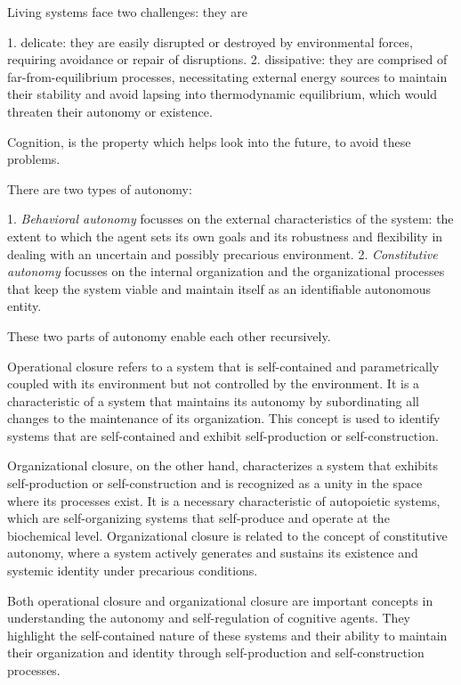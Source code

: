 Living systems face two challenges: they are 

1. delicate: they are easily disrupted or destroyed by environmental forces, requiring avoidance or repair of disruptions.
2. dissipative: they are comprised of far-from-equilibrium processes, necessitating external energy sources to maintain their stability and avoid lapsing into thermodynamic equilibrium, which would threaten their autonomy or existence.


Cognition, is the property which helps look into the future, to avoid these problems.

There are two types of autonomy:

1. \emph{Behavioral autonomy} focusses on the external characteristics of the system: the extent to which the agent sets its own goals and its robustness and flexibility in dealing with an uncertain and possibly precarious environment.
2. \emph{Constitutive autonomy} focusses on the internal organization and the organizational processes that keep the system viable and maintain itself as an identifiable autonomous entity.

These two parts of autonomy enable each other recursively.


Operational closure refers to a system that is self-contained and parametrically coupled with its environment but not controlled by the environment. It is a characteristic of a system that maintains its autonomy by subordinating all changes to the maintenance of its organization. This concept is used to identify systems that are self-contained and exhibit self-production or self-construction.

Organizational closure, on the other hand, characterizes a system that exhibits self-production or self-construction and is recognized as a unity in the space where its processes exist. It is a necessary characteristic of autopoietic systems, which are self-organizing systems that self-produce and operate at the biochemical level. Organizational closure is related to the concept of constitutive autonomy, where a system actively generates and sustains its existence and systemic identity under precarious conditions.

Both operational closure and organizational closure are important concepts in understanding the autonomy and self-regulation of cognitive agents. They highlight the self-contained nature of these systems and their ability to maintain their organization and identity through self-production and self-construction processes.

